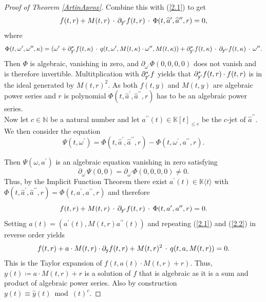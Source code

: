 \documentclass[10pt, a4paper]{article}
\def\wh{\widehat}
\theoremstyle{remark}
\theoremstyle{remark}
\begin{document}
\begin{proof}[Proof of Theorem \ref{ArtinAprox}]
\noindent Combine this with (\ref{2.1}) to get
\begin{equation}
f(t,r)+M(t,r)\,\cdot\,\partial_{\tt{y}^\prime}f(t,r)\,\cdot\,\Phi(t,\wh{a}^\prime,\wh{a}^{\prime\prime},r)=0,
\end{equation}
where \begin{equation}
\Phi(t,\omega^\prime,\omega^{\prime\prime},\kappa)=(\omega^\prime+\partial_{\tt{y}^\prime}^*f(t,\kappa)\,\cdot\, q(t,\omega^\prime,M(t,\kappa)\cdot \omega^{\prime\prime},M(t,\kappa))+\partial_{\tt{y}^\prime}^*f(t,\kappa)\,\cdot\,\partial_{\tt{y}^{\prime \prime}}f(t,\kappa)\,\cdot\,\omega^{\prime\prime}.
\end{equation}
\noindent Then $\Phi$ is algebraic, vanishing in zero, and $\partial_{\omega^\prime}\Phi(0,0,0,0)$ does not vanish and is therefore invertible.
Multitplication with $\partial_{\tt{y}^\prime}^*f$ yields that $\partial_{\tt{y}^\prime}^*f(t,r)\cdot f(t,r)$ is in the ideal generated by $M(t,r)^2.$ As both $f(t,y)$ and $M(t,y)$ are algebraic power series and $r$ is polynomial $\Phi(t,\wh{a}^\prime,\wh{a}^{\prime\prime},r)$ has to be an algebraic power series.
\\Now let $c\in\mathbb{N}$ be a natural number and let $a^{\prime\prime}(t)\in\mathbb{K}[t]_{\leq c}$ be the $c$-jet of $\wh{a}^{\prime\prime}$. We then consider the equation $$\Psi(t,\omega^\prime)=\Phi(t,\wh{a}^\prime,\wh{a}^{\prime\prime},r)-\Phi(t,\omega^\prime,a^{\prime\prime},r).$$

\noindent Then $\Psi(\omega,a^\prime)$ is an algebraic equation vanishing in zero satisfying $$\partial_{\omega^\prime}\Psi(0,0)=\partial_{\omega^\prime}\Phi(0,0,0,0)\neq0.$$
Thus, by the Implicit Function Theorem there exist $a^\prime(t)\in\mathbb{K}\langle t\rangle$ with $\Phi(t,\wh{a}^\prime,\wh{a}^{\prime\prime},r)=\Phi(t,a^\prime,a^{\prime\prime},r)$ and therefore $$f(t,r)+M(t,r)\,\cdot\,\partial_{\tt{y}^\prime}f(t,r)\,\cdot\,\Phi(t,a^\prime,a^{\prime\prime},r)=0.$$
Setting $a(t)=\left(a^\prime(t),M(t,r)a^{\prime\prime}(t)\right)$ and repeating (\ref{2.1}) and (\ref{2.2}) in reverse order yields  $$f(t,r)+a\cdot M(t,r)\cdot\partial_{\tt{y}}f(t,r)+M(t,r)^2\,\cdot\, q(t,a,M(t,r))=0.$$
This is the Taylor expansion of $f(t,a(t)\cdot M(t,r)+r)$. Thus, $y(t)\coloneqq a\cdot M(t,r)+r$ is a solution of $f$ that is algebraic as it is a sum and product of algebraic power series. Also by construction $y(t)\equiv\wh{y}(t)\bmod (t)^c$.
\end{proof}
\end{document}
